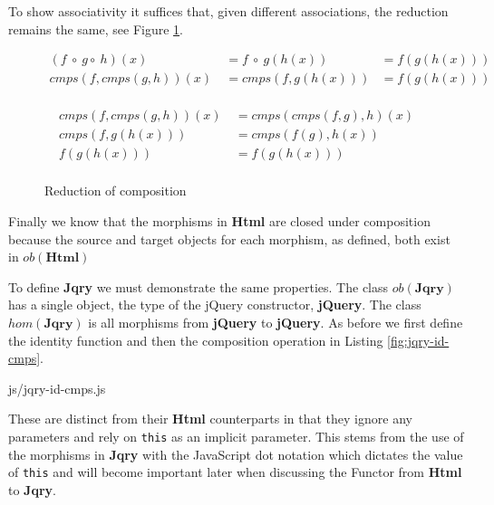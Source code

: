 \documentclass[preprint]{sigplanconf}
\begin{document}
To show associativity it suffices that, given different associations, the reduction remains the same, see Figure \ref{fig:html-associativity}.

\begin{figure}[!ht]
\begin{displaymath}
\begin{aligned}
(f\ \circ\ g \circ\ h)(x)\ &= f\ \circ\ g(h(x)) &= f(g(h(x)))\\
cmps(f,cmps(g,h))(x)\ &= cmps(f, g(h(x))) &= f(g(h(x)))\\
\end{aligned}
\end{displaymath}

\begin{displaymath}
\begin{aligned}
cmps(f,cmps(g,h))(x)\ &= cmps(cmps(f,g),h)(x) \\
cmps(f,g(h(x)))\ &= cmps(f(g),h(x)) \\
f(g(h(x)))\ &= f(g(h(x)))\\
\end{aligned}
\end{displaymath}
\nocaptionrule \caption{Reduction of composition}
\label{fig:html-associativity}
\end{figure}

Finally we know that the morphisms in \textbf{Html} are closed under composition because the source and target objects for each morphism, as defined, both exist in \begin{math}ob(\mathbf{Html})\end{math}

To define \textbf{Jqry} we must demonstrate the same properties. The class \begin{math}ob(\mathbf{Jqry})\end{math} has a single object, the type of the jQuery constructor, \textbf{jQuery}. The class \begin{math}hom(\mathbf{Jqry})\end{math} is all morphisms from \textbf{jQuery} to \textbf{jQuery}. As before we first define the identity function and then the composition operation in Listing \ref{fig:jqry-id-cmps}.

\begin{lstinputlisting}[
    language=JavaScript,
    label={fig:jqry-id-cmps},
    escapeinside={@}{@}
]{js/jqry-id-cmps.js}
\end{lstinputlisting}

These are distinct from their \textbf{Html} counterparts in that they ignore any parameters and rely on \verb|this| as an implicit parameter. This stems from the use of the morphisms in \textbf{Jqry} with the JavaScript dot notation which dictates the value of \verb|this| and will become important later when discussing the Functor from \textbf{Html} to \textbf{Jqry}.
\end{document}
